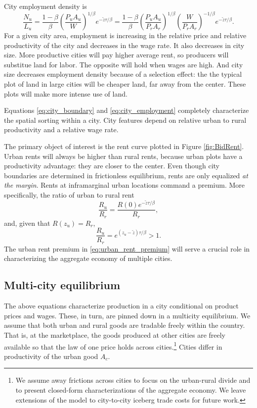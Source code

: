\documentclass[12pt]{article}
\begin{document}
City employment density is
\begin{equation}\label{eq:city_employment}
\frac{N_u}{L_u} = \frac{1-\beta}{\beta} \left(\frac{P_uA_u}{W}\right)^{1/\beta} e^{-\tilde z\tau/\beta}
=\frac{1-\beta}{\beta}
	 \left(\frac{P_uA_u}{P_rA_r}\right)^{1/\beta}
	 \left(\frac{W}{P_rA_r}\right)^{-1/\beta}
	 e^{-\tilde z{\tau/\beta}}.
\end{equation}
For a given city area, employment is increasing in the relative price and relative productivity of the city and decreases in the wage rate. It also decreases in city size. More productive cities will pay higher average rent, so producers will substitue land for labor. The opposite will hold when wages are high. And city size decreases employment density because of a selection effect: the the typical plot of land in large cities will be cheaper land, far away from the center. These plots will make more intense use of land.

Equations \eqref{eq:city_boundary} and \eqref{eq:city_employment} completely characterize the spatial sorting within a city. City features depend on relative urban to rural productivity and a relative wage rate.

The primary object of interest is the rent curve plotted in Figure \ref{fig:BidRent}. Urban rents will always be higher than rural rents, because urban plots have a productivity advantage: they are closer to the center. Even though city boundaries are determined in frictionless equilibrium, rents are only equalized \emph{at the margin}. Rents at inframarginal urban locations command a premium. More specifically,
the ratio of urban to rural rent
\[
\frac{R_u}{R_r} = \frac{R(0)e^{-\tilde z \tau /\beta}} {R_r},
\]
and, given that $R(z_u)=R_r$,
\begin{equation}\label{eq:urban_rent_premium}
\frac{R_u}{R_r} = e^{(z_u-\tilde z) \tau /\beta}>1.
\end{equation}
The urban rent premium in \eqref{eq:urban_rent_premium} will serve a crucial role in characterizing the aggregate economy of multiple cities.

\subsection{Multi-city equilibrium}
The above equations characterize production in a city conditional on product prices and wages. These, in turn, are pinned down in a multicity equilibrium. We assume that both urban and rural goods are tradable freely within the country. That is, at the marketplace, the goods produced at other cities are freely available so that the law of one price holds across cities.\footnote{We assume away frictions across cities to focus on the urban-rural divide and to present closed-form characterizations of the aggregate economy. We leave extensions of the model to city-to-city iceberg trade costs for future work.} Cities differ in productivity of the urban good $A_c$.
\end{document}
